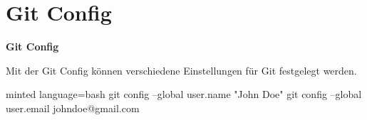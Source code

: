 \section{Git Config}\label{sec:git-config}

\begin{frame}[b]
    \begin{center}
        \fontsize{48pt}{48pt}
        \faCog
    \end{center}
    \vfill
    \begin{flushleft}
        \Huge
        \textbf{Git Config}
    \end{flushleft}
\end{frame}

\begin{frame}[fragile]
    \slidehead
    Mit der Git Config können verschiedene Einstellungen für Git festgelegt werden.
    \begin{codeBlock}[]{minted language=bash}
        git config --global user.name "John Doe"
        git config --global user.email johndoe@gmail.com
    \end{codeBlock}
\end{frame}
